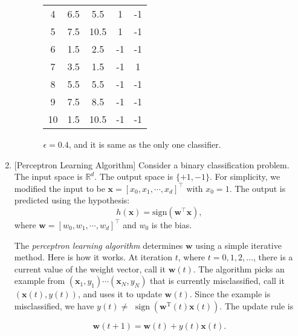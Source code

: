\documentclass[10pt]{article}
\begin{document}
\begin{enumerate}[1.]
\begin{enumerate}
\begin{enumerate}[(1)]
\begin{center}
\begin{tabular}{|c|cc|c|c|}
                        4 & 6.5 & 5.5 & 1 &-1\\
                        5 & 7.5 & 10.5 & 1 &-1\\
                        6 & 1.5 & 2.5 & -1 &-1\\
                        7 & 3.5 & 1.5 & -1 &1\\
                        8 & 5.5 & 5.5 & -1 &-1\\
                        9 & 7.5 & 8.5 & -1 &-1\\
                        10 & 1.5 & 10.5 & -1 &-1\\
                        \hline
                    \end{tabular}
                \end{center}
                $\epsilon=0.4$, and it is same as the only one classifier.
            \end{enumerate}
        \end{enumerate}
        \newpage

	\item {} [Perceptron Learning Algorithm]
            Consider a binary classification problem. The input space is $\mathbb{R}^{d}$. The output space is $\{ +1, -1 \}$. For simplicity, we modified the input to be $\mathbf{x} = [x_0, x_1, \cdots, x_d]^{\intercal}$ with $x_0=1$. The output is predicted using the hypothesis:
            \begin{equation}
                h(\mathbf{x}) = \text{sign}(\mathbf{w}^{\intercal}\mathbf{x}),
            \end{equation}
            where $\mathbf{w} = [w_0, w_1, \cdots, w_d]^{\intercal}$ and $w_0$ is the bias.
            
            The \textit{perceptron learning algorithm} determines $\mathbf{w}$ using a simple iterative method. Here is how it works. At iteration $t$, where $t=0,1,2, \ldots$, there is a current value of the weight vector, call it $\mathbf{w}(t)$. The algorithm picks an example from $\left(\mathbf{x}_1, y_1\right) \cdots\left(\mathbf{x}_N, y_N\right)$ that is currently misclassified, call it $(\mathbf{x}(t), y(t))$, and uses it to update $\mathbf{w}(t)$. Since the example is misclassified, we have $y(t) \neq$ $\operatorname{sign}\left(\mathbf{w}^{\mathrm{T}}(t) \mathbf{x}(t)\right)$. The update rule is

            \begin{equation}
                \mathbf{w}(t+1)=\mathbf{w}(t)+y(t) \mathbf{x}(t).    
            \end{equation}


\end{enumerate}
\end{document}
